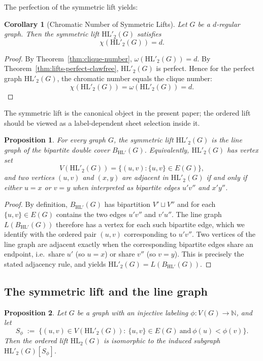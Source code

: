 \documentclass[11pt]{article}
\newtheorem{corollary}{Corollary}
\newtheorem{proposition}{Proposition}
\newcommand{\HL}{\mathrm{HL}}
\theoremstyle{plain}
\begin{document}
The perfection of the symmetric lift yields:

\begin{corollary}[Chromatic Number of Symmetric Lifts]
Let \( G \) be a \( d \)-regular graph. Then the symmetric lift \( \mathrm{HL}'_2(G) \) satisfies
\[
\chi(\mathrm{HL}'_2(G)) = d.
\]
\end{corollary}

\begin{proof}
By Theorem~\ref{thm:clique-number}, \(\omega(\HL'_2(G))=d\). By Theorem~\ref{thm:lifts-perfect-clawfree},
\(\HL'_2(G)\) is perfect. Hence for the perfect graph \(\HL'_2(G)\), the chromatic number equals the
clique number:
\[
\chi(\HL'_2(G))=\omega(\HL'_2(G))=d.
\]
\end{proof}

The symmetric lift is the canonical object in the present paper; the ordered lift should be viewed as a
label-dependent sheet selection inside it.

\begin{proposition}\label{prop:HLprime2-is-linegraph}
For every graph $G$, the symmetric lift $\HL'_2(G)$ is the line graph of the
bipartite double cover $B_{\HL'}(G)$. Equivalently, $\HL'_2(G)$ has vertex set
\[
V(\HL'_2(G))=\{(u,v):\{u,v\}\in E(G)\},
\]
and two vertices $(u,v)$ and $(x,y)$ are adjacent in $\HL'_2(G)$ if and only if
either $u=x$ or $v=y$ when interpreted as bipartite edges $u'v''$ and $x'y''$.
\end{proposition}

\begin{proof}
By definition, $B_{\HL'}(G)$ has bipartition $V'\sqcup V''$ and for each
$\{u,v\}\in E(G)$ contains the two edges $u'v''$ and $v'u''$. The line graph
$L(B_{\HL'}(G))$ therefore has a vertex for each such bipartite edge, which we
identify with the ordered pair $(u,v)$ corresponding to $u'v''$.
Two vertices of the line graph are adjacent exactly when the corresponding
bipartite edges share an endpoint, i.e.\ share $u'$ (so $u=x$) or share $v''$
(so $v=y$). This is precisely the stated adjacency rule, and yields
$\HL'_2(G)=L(B_{\HL'}(G))$.
\end{proof}

\subsection{The symmetric lift and the line graph}

\begin{proposition}\label{prop:HL2-induced-in-HLprime2}
Let $G$ be a graph with an injective labeling $\phi:V(G)\to\mathbb{N}$, and let
\[
S_\phi \;:=\; \{(u,v)\in V(\HL'_2(G)):\ \{u,v\}\in E(G)\ \text{and}\ \phi(u)<\phi(v)\}.
\]
Then the ordered lift $\HL_2(G)$ is isomorphic to the induced subgraph
$\HL'_2(G)[S_\phi]$.
\end{proposition}
\end{document}
